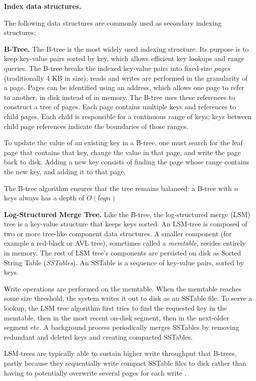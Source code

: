 \medskip
\noindent
\textbf{Index data structures.}

\noindent
The following data structures are commonly used as secondary indexing structures:

\medskip
\noindent
\textbf{B-Tree.}
The B-tree is the most widely used indexing structure.
Its purpose is to keep key-value pairs sorted by key, which allows efficient key lookups and range queries.
The B-tree breaks the indexed key-value pairs into fixed-size \textit{pages} (traditionally 4 KB in size);
reads and writes are performed in the granularity of a page.
Pages can be identified using an address, which allows one page to refer to another, in disk instead of in memory.
The B-tree uses these references to construct a tree of pages.
Each page contains multiple keys and references to child pages.
Each child is responsible for a continuous range of keys; keys between child page references indicate the boundaries
of those ranges.

To update the value of an existing key in a B-tree, one must search for the leaf page that contains that key,
change the value in that page, and write the page back to disk.
Adding a new key consists of finding the page whose range contains the new key, and adding it to that page.

The B-tree algorithm ensures that the tree remains balanced: a B-tree with $n$ keys always has a depth of $O(log n)$

\medskip
\noindent
\textbf{Log-Structured Merge Tree.}
Like the B-tree, the log-structured merge (LSM) tree is a key-value structure that keeps keys sorted.
An LSM-tree is composed of two or more tree-like component data structures.
A smaller component (for example a red-black or AVL tree), sometimes called a \textit{memtable},
resides entirely in memory.
The rest of LSM tree's components are persisted on disk as Sorted String Table (\textit{SSTables}).
An SSTable is a sequence of key-value pairs, sorted by keys.

Write operations are performed on the memtable.
When the memtable reaches some size threshold, the system writes it out to disk as an SSTable file.
To serve a lookup, the LSM tree algorithm first tries to find the requested key in the memtable,
then in the most recent on-disk segment, then in the next-older segment etc.
A background process periodically merges SSTables by removing redundant and deleted keys and creating compacted SSTables.

LSM-trees are typically able to sustain higher write throughput that B-trees, partly because they sequentially write
compact SSTable files to disk rather than having to potentially overwrite several pages for each write \cite{lsm:vsbtree}.

